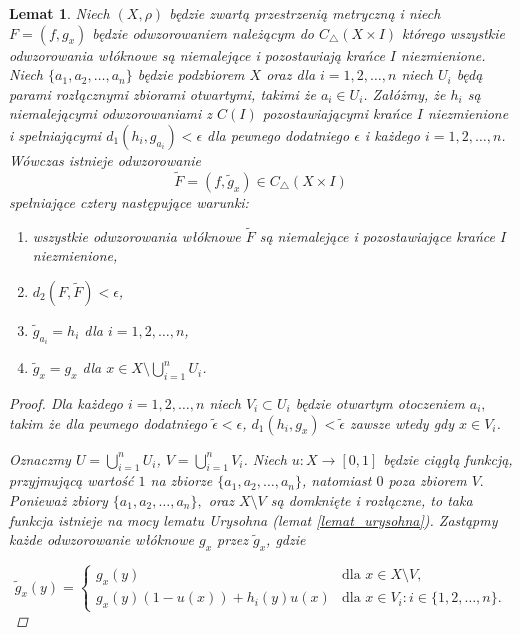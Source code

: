 \documentclass[licencjacka]{pwr_wmat_praca_dyplomowa}
\theoremstyle{plain}
\numberwithin{theorem}{chapter}
\newtheorem{lemma}[theorem]{Lemat}
\theoremstyle{definition}
\numberwithin{theorem}{chapter}
\begin{document}
\begin{lemma}
\label{lemat_4_glownego_artykulu}
\cite{alseda1999entropy}
Niech $(X, \rho)$ będzie zwartą przestrzenią metryczną i niech $F = (f, g_x)$ będzie odwzorowaniem należącym do $C_\triangle(X \times I)$ którego wszystkie odwzorowania włóknowe są niemalejące i pozostawiają krańce $I$ niezmienione. Niech $\{a_1, a_2, \ldots, a_n\}$ będzie podzbiorem $X$ oraz dla $i = 1, 2, \ldots, n$ niech $U_i$ będą parami rozłącznymi zbiorami otwartymi, takimi że $a_i \in U_i$. Załóżmy, że $h_i$ są niemalejącymi odwzorowaniami z $C(I)$ pozostawiającymi krańce $I$ niezmienione i spełniającymi $d_1(h_i, g_{a_i}) < \epsilon$ dla pewnego dodatniego $\epsilon$ i każdego $i = 1, 2, \ldots, n$. Wówczas istnieje odwzorowanie 
$$\widetilde{F} = (f, \widetilde{g}_x) \in C_\triangle(X \times I)$$ spełniające cztery następujące warunki:

\begin{enumerate}
\item  wszystkie odwzorowania włóknowe $\widetilde{F}$ są niemalejące i pozostawiające krańce $I$ niezmienione,
\item $d_2(F, \widetilde{F}) < \epsilon$,
\item $\widetilde{g}_{a_i} = h_i$ dla $i = 1,2,\ldots,n$,
\item $\widetilde{g}_x = g_x$ dla $x \in X \setminus \bigcup_{i=1}^n U_i$.
\end{enumerate}

\begin{proof}
\cite{alseda1999entropy}
Dla każdego $i = 1, 2, \ldots, n$ niech $V_i \subset U_i$ będzie otwartym otoczeniem $a_i,$ takim że dla pewnego dodatniego $\widetilde{\epsilon} < \epsilon$, $d_1(h_i, g_x) < \widetilde{\epsilon}$ zawsze wtedy gdy $x \in V_i$.

Oznaczmy $U = \bigcup_{i=1}^n U_i$, $V = \bigcup_{i=1}^n V_i$. Niech $u : X \longrightarrow [0,1]$  będzie ciągłą funkcją, przyjmującą wartość $1$ na zbiorze $\{a_1, a_2, \ldots, a_n\}$, natomiast $0$ poza zbiorem $V.$ 
{\color{red}Ponieważ zbiory $\{a_1, a_2, \ldots, a_n\},$ oraz $X \setminus V$ są domknięte i rozłączne, to taka funkcja istnieje na mocy lematu Urysohna (lemat \ref{lemat_urysohna}).}
Zastąpmy każde odwzorowanie włóknowe $g_x$ przez $\widetilde{g}_x$, gdzie

\begin{equation} \label{lemat4_rownanie_1}
    \widetilde{g}_x(y) =
    \begin{cases}
        g_x(y) & \text{dla $x \in X \setminus V$,}\\
        g_x(y)(1-u(x))+h_i(y)u(x) & \text{dla $x \in V_i : i \in \{1,2,\ldots,n\}$.}
    \end{cases}
\end{equation}


\end{proof}
\end{lemma}
\end{document}
